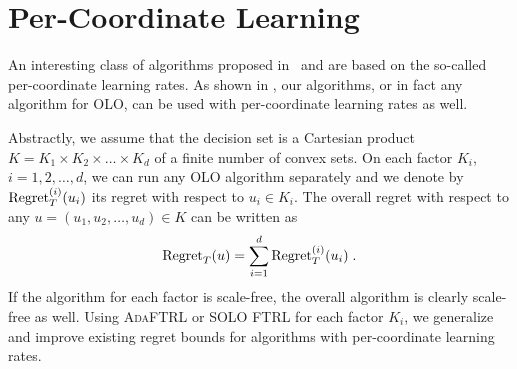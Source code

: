 \section{Per-Coordinate Learning}

An interesting class of algorithms proposed in~\cite{McMahan-Streeter-2010} and
\cite{Duchi-Hazan-Singer-2011} are based on the so-called per-coordinate
learning rates.  As shown in \cite{Streeter-McMahan-2010}, our algorithms, or
in fact any algorithm for OLO, can be used with per-coordinate
learning rates as well.

Abstractly, we assume that the decision set is a Cartesian product $K=K_1
\times K_2 \times \dots \times K_d$ of a finite number of convex sets.  On each
factor $K_i$, $i=1,2,\dots,d$, we can run any OLO algorithm separately and we
denote by $\operatorname{Regret}_T^{(i)}(u_i)$ its regret with respect to $u_i \in K_i$. The
overall regret with respect to any $u=(u_1, u_2, \dots, u_d) \in K$ can be
written as
$$
\operatorname{Regret}_T(u) = \sum_{i=1}^d \operatorname{Regret}_T^{(i)}(u_i) \; .
$$
If the algorithm for each factor is scale-free, the overall algorithm is
clearly scale-free as well.  Using \textsc{AdaFTRL} or \textsc{SOLO FTRL} for
each factor $K_i$, we generalize and improve existing regret bounds
\cite{McMahan-Streeter-2010,Duchi-Hazan-Singer-2011} for algorithms with per-coordinate
learning rates.
